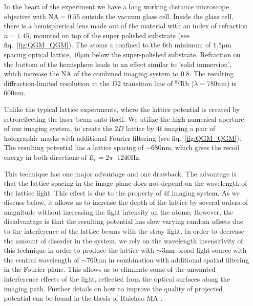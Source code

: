 In the heart of the experiment we have a long working distance microscope objective with $\textrm{NA} = 0.55$ outside the vacuum glass cell. Inside the glass cell, there is a hemispherical lens made out of the material with an index of refraction $n=1.45$, mounted on top of the super polished substrate (see fiq.~\ref{fig:QGM_QGM}). The atoms a confined to the $6\mathrm{th}$ minimum of $1.5\mathrm{\mu m}$ spacing optical lattice, $10\mathrm{\mu m}$ below the super-polished substrate. Refraction on the bottom of the hemisphere leads to an effect similar to 'solid immersion', which increase the NA of the combined imaging system to $0.8$. The resulting diffraction-limited resolution at the $D2$ transition line of $^{87}\mathrm{Rb}$ ($\lambda = 780\mathrm{nm}$) is $600\mathrm{nm}$. 

Unlike the typical lattice experiments, where the lattice potential is created by retroreflecting the laser beam onto itself. We utilize the high numerical aperture of our imaging system, to create the $2D$ lattice by $4\mathrm{f}$ imaging a pair of holographic masks with additional Fourier filtering (see fiq.~\ref{fig:QGM_QGM}). The resulting potential has a lattice spacing of $\sim 680\mathrm{nm}$, which gives the recoil energy in both directions of $E_r = 2\pi \cdot 1240\mathrm{Hz}$.

This technique has one major advantage and one drawback. The advantage is that the lattice spacing in the image plane does not depend on the wavelength of the lattice light. This effect is due to the property of $4\mathrm{f}$ imaging system. As we discuss below, it allows us to increase the depth of the lattice by several orders of magnitude without increasing the light intensity on the atoms. However, the disadvantage is that the resulting potential has slow varying random offsets due to the interference of the lattice beams with the stray light. In order to decrease the amount of disorder in the system, we rely on the wavelength insensitivity of this technique in order to produce the lattice with $\sim 3\mathrm{nm}$ broad light source with the central wavelength of $\sim 760\mathrm{nm}$ in combination with additional spatial filtering in the Fourier plane. This allows us to eliminate some of the unwanted interference effects of the light, reflected from the optical surfaces along the imaging path. Further details on how to improve the quality of projected potential can be found in the thesis of Ruichao MA \cite{ma thesis}.

